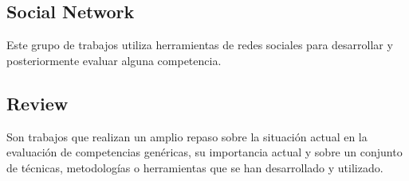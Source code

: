 \subsection{Social Network}
Este grupo de trabajos utiliza herramientas de redes sociales para desarrollar y posteriormente evaluar alguna competencia.
\subsection{Review}
Son trabajos que realizan un amplio repaso sobre la situación actual en la evaluación de competencias genéricas, su importancia actual y sobre un conjunto de técnicas, metodologías o herramientas que se han desarrollado y utilizado.






